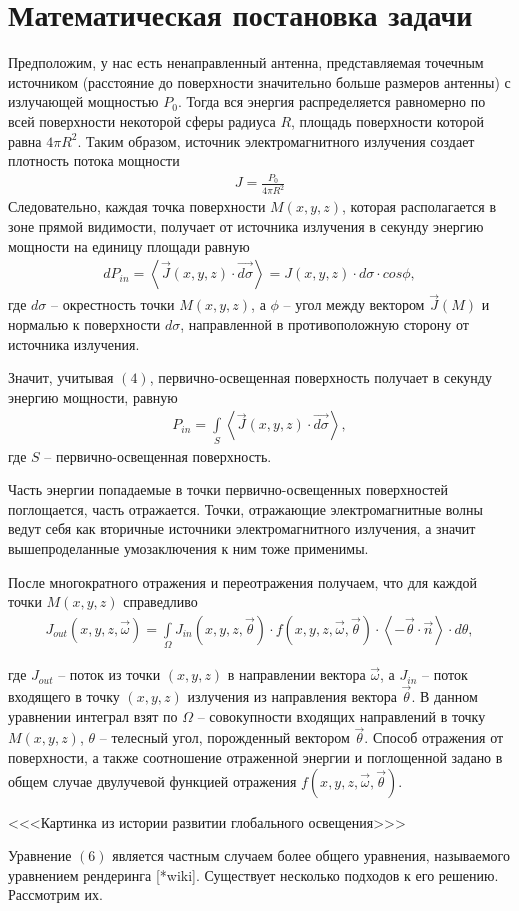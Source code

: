 \newpage
\section*{Математическая постановка задачи}

Предположим, у нас есть ненаправленный антенна, представляемая точечным источником (расстояние до поверхности значительно больше размеров антенны) с излучающей мощностью $P_0$. Тогда вся энергия распределяется равномерно по всей поверхности некоторой сферы радиуса $R$, площадь поверхности которой равна $ 4 \pi R^2 $. Таким образом, источник электромагнитного излучения создает плотность потока мощности
\begin{gather}
   J = \frac{P_0}{4 \pi R^2}
\end{gather}
Следовательно, каждая точка поверхности $ M(x, y, z) $, которая располагается в зоне прямой видимости, получает от источника излучения в секунду энергию мощности на единицу площади равную
\begin{gather}
  dP_{in} =   \left\langle  {\vec{J}(x,y,z) \cdot  \vec{d\sigma} } \right\rangle = J(x,y,z) \cdot d\sigma \cdot cos \phi ,
\end{gather}
где $d\sigma$ -- окрестность точки $ M(x, y, z) $, а $\phi$ -- угол между вектором $ \vec{J}(M) $ и нормалью к поверхности $d\sigma$, направленной в противоположную сторону от источника излучения.  

Значит, учитывая $(4)$, первично-освещенная поверхность получает в секунду энергию мощности, равную 
\begin{gather}
  P_{in} =   \int \limits_S \left\langle  {\vec{J}(x,y,z) \cdot  \vec{d\sigma} } \right\rangle,
\end{gather}
где $ S $ -- первично-освещенная поверхность.

Часть энергии попадаемые в точки первично-освещенных поверхностей поглощается, часть отражается. Точки, отражающие электромагнитные волны ведут себя как вторичные источники электромагнитного излучения, а значит вышепроделанные умозаключения к ним тоже применимы. 

После многократного отражения и переотражения получаем, что для каждой точки $ M(x,y,z) $ справедливо
\begin{gather}
  J_{out}(x,y,z,\vec \omega) = \int \limits_\Omega J_{in}(x,y,z,\vec \theta) \cdot f(x,y,z,\vec \omega,\vec \theta) \cdot \left\langle  {-\vec \theta \cdot \vec n} \right\rangle \cdot d\theta,
\end{gather}

где $ J_{out} $ -- поток из точки $(x,y,z)$ в направлении вектора $ \vec \omega $, а $ J_{in} $ -- поток входящего в точку $(x,y,z)$ излучения из направления вектора $ \vec \theta $. В данном уравнении интеграл взят по $ \Omega $ -- совокупности входящих направлений в точку $M(x,y,z)$, $\theta$ -- телесный угол, порожденный вектором $\vec \theta$. Способ отражения от поверхности, а также соотношение отраженной энергии и поглощенной задано в общем случае двулучевой функцией отражения $ f(x,y,z,\vec \omega,\vec \theta) $. 

<<<Картинка из истории развитии глобального освещения>>>

Уравнение $(6)$ является частным случаем более общего уравнения, называемого уравнением рендеринга [*wiki]. Существует несколько подходов к его решению. Рассмотрим их.
